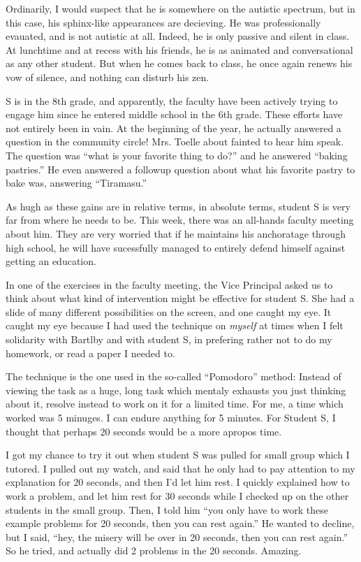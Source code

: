 \documentclass[11pt]{elegantbook}
\begin{document}
Ordinarily, I would suspect that he is somewhere on the autistic
spectrum, but in this case, his sphinx-like appearances are decieving.
He was professionally evauated, and is not autistic at all.  Indeed,
he is only passive and silent in class.  At lunchtime and at recess
with his friends, he is as animated and conversational as any other
student.  But when he comes back to class, he once again renews his
vow of silence, and nothing can disturb his zen.

S is in the 8th grade, and apparently, the faculty have been actively
trying to engage him since he entered middle school in the 6th grade.
These efforts have not entirely been in vain.  At the beginning of the
year, he actually answered a question in the community circle!
Mrs. Toelle about fainted to hear him speak.  The question was ``what
is your favorite thing to do?'' and he answered ``baking pastries.''
He even answered a followup question about what his favorite pastry to bake was,
answering ``Tiramasu.''

As hugh as these gains are in relative terms, in absolute terms,
student S is very far from where he needs to be.  This week, there was
an all-hands faculty meeting about him.  They are very worried that if
he maintains his anchoratage through high school, he will have
sucessfully managed to entirely defend himself against getting an
education.

In one of the exercises in the faculty meeting, the Vice Principal
asked us to think about what kind of intervention might be effective
for student S.  She had a slide of many different possibilities on the
screen, and one caught my eye.  It caught my eye because I had used
the technique on {\em myself} at times when I felt solidarity with
Bartlby and with student S, in prefering rather not to do my homework,
or read a paper I needed to.

The technique is the one used in the so-called ``Pomodoro'' method:
Instead of viewing the task as a huge, long task which mentaly
exhausts you just thinking about it, resolve instead to work on it for
a limited time.  For me, a time which worked was 5 minuges.  I can
endure anything for 5 minutes.  For Student S, I thought that perhaps
20 seconds would be a more apropos time.

I got my chance to try it out when student S was pulled for small group
which I tutored.  I pulled out my watch, and said that he only had to
pay attention to my explanation for 20 seconds, and then I'd let him
rest.  I quickly explained how to work a problem, and let him rest for
30 seconds while I checked up on the other students in the small
group.  Then, I told him ``you only have to work these example
problems for 20 seconds, then you can rest again.''  He wanted to
decline, but I said, ``hey, the misery will be over in 20 seconds,
then you can rest again.''  So he tried, and actually did 2 problems in
the 20 seconds.   Amazing.
\end{document}
